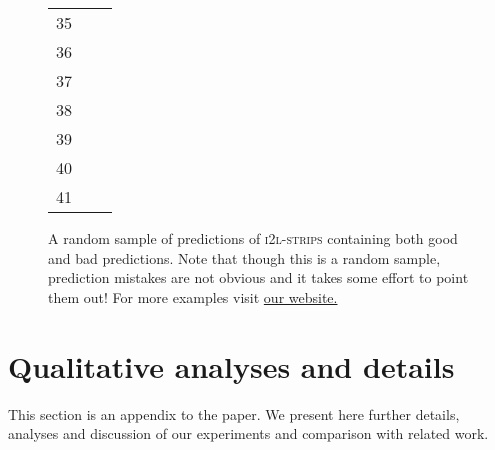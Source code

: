 \documentclass{article}
\newcommand{\website}{https://untrix.github.io/i2l/}
\begin{document}
\begin{figure*}[p]
\begin{tabular}{lll}
\scriptsize{35} &  & \\
\scriptsize{36} &  & \\
\scriptsize{37} &  & \\
\scriptsize{38} &  & \\
\scriptsize{39} &  & \\
\scriptsize{40} &  & \\
\scriptsize{41} &  & \\
 	\end{tabular}
	\centering
	\caption[Random Sample of Predictions]{A random sample of predictions of \textsc{i2l-strips} containing both good and bad predictions. Note that though this is a random sample, prediction mistakes are not obvious and it takes some effort to point them out! For more examples visit \href{\website}{our website.}\footnotemark[105]}
	\label{fig-rand-preds}
\end{figure*}

\section{Qualitative analyses and details}
\label{observations}
This section is an appendix to the paper. We present here further details, analyses and discussion of our experiments and comparison with related work.
\end{document}
